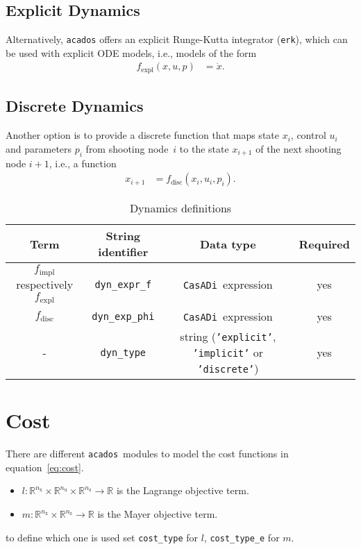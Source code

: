 \documentclass[
a4paper, %
10pt, %
notitlepage,
english]{CSUniSchoolLabReport}
\newcommand{\code}[1]{\texttt{#1}}
\newcommand{\str}[1]{\texttt{'#1'}}
\newcommand{\casadi}{\texttt{CasADi}}
\newcommand{\acados}{\texttt{acados}}
\newcommand{\ind}[1]{_{\textrm{#1}}}
\newcommand{\nx}{n\ind{x}}
\newcommand{\nuu}{n\ind{u}}
\newcommand{\nz}{n\ind{z}}
\newcommand{\mandatory}{yes}
\begin{document}
\begin{appendices}
%
\subsection{Explicit Dynamics}\label{sec:dynamics:explicit}
%
Alternatively, \acados{} offers an explicit Runge-Kutta integrator (\code{erk}), which can be used with explicit ODE models, i.e., models of the form
\begin{align}
	f\ind{expl}(x,u,p) &= \dot{x}.\label{eq:dynamics:explicit}
\end{align}
%
\subsection{Discrete Dynamics}\label{sec:dynamics:discrete}
%
Another option is to provide a discrete function that maps state $x_i$, control $u_i$ and parameters $p_i$ from shooting node~$i$ to the state $x_{i+1}$ of the next shooting node $i+1$, i.e., a function
\begin{align}
	x_{i+1} &= f\ind{disc}(x_i,u_i,p_i).\label{eq:dynamics:discrete}
\end{align}
%
\begin{table}[h!]
	\centering
	\caption{Dynamics definitions} \label{tab:dynamics}
	\begin{tabular}{cccc}
		\toprule
		Term & String identifier & Data type & Required \\ \midrule
		$ f\ind{impl} $ respectively $ f\ind{expl} $ & \code{dyn\_expr\_f}    & \casadi~expression & \mandatory \\
		$f\ind{disc}$ & \code{dyn\_exp\_phi} & \casadi~expression & \mandatory \\
		- & \code{dyn\_type}    & string (\str{explicit}, \str{implicit} or \str{discrete}) & \mandatory \\
		\bottomrule
	\end{tabular}
\end{table}
%
\section{Cost}\label{sec:cost}
%
There are different \acados~modules to model the cost functions in equation~\eqref{eq:cost}.
\begin{itemize}
	\item $ l: \mathbb{R}^{\nx}\times\mathbb{R}^{\nuu}\times\mathbb{R}^{\nz} \rightarrow \mathbb{R}$ is the Lagrange objective term.
	\item $ m: \mathbb{R}^{\nx}\times\mathbb{R}^{\nz} \rightarrow \mathbb{R} $ is the Mayer objective term.
\end{itemize}
to define which one is used set \code{cost\_type} for $l$, \code{cost\_type\_e} for $m$.


\end{appendices}
\end{document}
